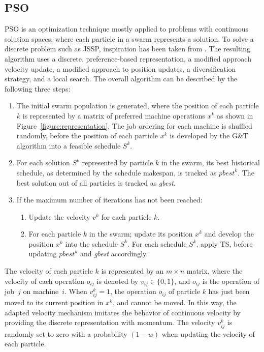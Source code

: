 \documentclass[paper=a4, fontsize=9pt]{scrartcl}
\begin{document}
\begin{multicols}{2}
\section*{\acl{PSO}}

\acf{PSO} is an optimization technique mostly applied to problems with continuous solution spaces, where each particle in a swarm represents a solution. To solve a discrete problem such as \ac{JSSP}, inspiration has been taken from \cite{sha2006hybrid}. The resulting algorithm uses a discrete, preference-based representation, a modified approach velocity update, a modified approach to position updates, a diversification strategy, and a local search. The overall algorithm can be described by the following three steps:

\begin{enumerate}
    \item The initial swarm population is generated, where the position of each particle $k$ is represented by a matrix of preferred machine operations $x^k$ as shown in Figure~\ref{figure:representation}. The job ordering for each machine is shuffled randomly, before the position of each particle $x^k$ is developed by the G\&T algorithm into a feasible schedule $S^k$.
    \item For each solution $S^k$ represented by particle $k$ in the swarm, its best historical schedule, as determined by the schedule makespan, is tracked as $\textit{pbest}^k$. The best solution out of all particles is tracked as \textit{gbest}.
    \item If the maximum number of iterations has not been reached:
    \begin{enumerate}
        \item Update the velocity $v^k$ for each particle $k$.
        \item For each particle $k$ in the swarm; update its position $x^k$ and develop the position $x^k$ into the schedule $S^k$. For each schedule $S^k$, apply \ac{TS}, before updating $\textit{pbest}^k$ and \textit{gbest} accordingly.
    \end{enumerate}
\end{enumerate}

The velocity of each particle $k$ is represented by an $m \times n$ matrix, where the velocity of each operation $o_{ij}$ is denoted by $v_{ij} \in \{0,1\}$, and $o_{ij}$ is the operation of job~$j$ on machine~$i$. When $v_{ij}^k = 1$, the operation $o_{ij}$ of particle $k$ has just been moved to its current position in $x^k$, and cannot be moved. In this way, the adapted velocity mechanism imitates the behavior of continuous velocity by providing the discrete representation with momentum. The velocity $v_{ij}^k$ is randomly set to zero with a probability $(1-w)$ when updating the velocity of each particle.


\end{multicols}
\end{document}
